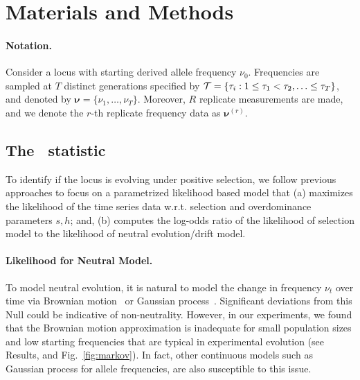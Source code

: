 \documentclass[11pt]{article}
\def\comale{\text{{\sc Comale}}}
\begin{document}
\section{Materials and Methods}

\paragraph{Notation.} 
Consider a locus with starting derived allele frequency
$\nu_0$. Frequencies are sampled at $T$ distinct generations specified
by ${\cal T}= \{\tau_i: 1\le \tau_1<\tau_2,\ldots\le \tau_T\}$, and
denoted by $\bm{\nu}=\{\nu_1,\ldots,\nu_T\}$. Moreover, $R$ replicate
measurements are made, and we denote the $r$-th replicate frequency
data as $\bm{\nu}^{(r)}$.

\subsection{The \comale\  statistic}
To identify if the locus is evolving under positive selection, we
follow previous approaches to focus on a parametrized likelihood based
model that (a) maximizes the likelihood of the time series data
w.r.t. selection and overdominance parameters $s,h$; and, (b) computes
the log-odds ratio of the likelihood of selection model to the
likelihood of neutral evolution/drift model.

\paragraph{Likelihood for Neutral Model.}
To model neutral evolution, it is natural to model the change in
frequency $\nu_t$ over time via Brownian
motion~\cite{feder2014Identifying} or Gaussian
process~\cite{Terhorst2015Multi}. Significant deviations from this
Null could be indicative of non-neutrality. However, in our
experiments, we found that the Brownian motion approximation is
inadequate for small population sizes and low starting frequencies
that are typical in experimental evolution (see Results, and
Fig.~\ref{fig:markov}). In fact, other continuous models such as
Gaussian process for allele frequencies, are also susceptible to this
issue.
\end{document}
